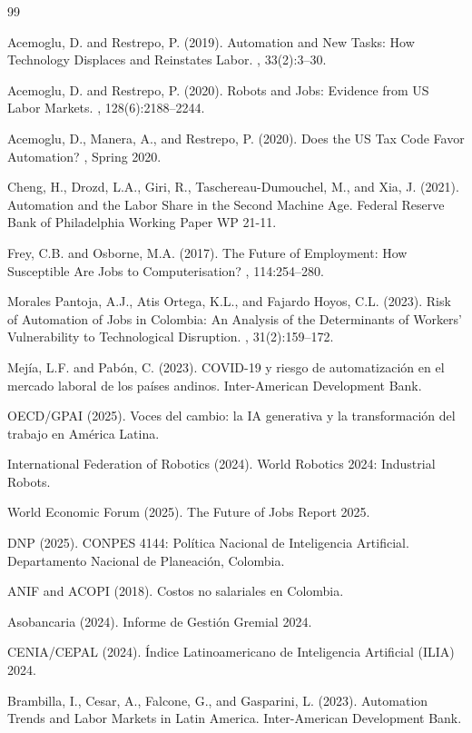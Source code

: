 \documentclass{article}
\begin{document}
\begin{thebibliography}{99}

Acemoglu, D. and Restrepo, P. (2019).
\newblock Automation and New Tasks: How Technology Displaces and Reinstates Labor.
, 33(2):3--30.

Acemoglu, D. and Restrepo, P. (2020).
\newblock Robots and Jobs: Evidence from US Labor Markets.
, 128(6):2188--2244.

Acemoglu, D., Manera, A., and Restrepo, P. (2020).
\newblock Does the US Tax Code Favor Automation?
, Spring 2020.

Cheng, H., Drozd, L.A., Giri, R., Taschereau-Dumouchel, M., and Xia, J. (2021).
\newblock Automation and the Labor Share in the Second Machine Age.
\newblock Federal Reserve Bank of Philadelphia Working Paper WP 21-11.

Frey, C.B. and Osborne, M.A. (2017).
\newblock The Future of Employment: How Susceptible Are Jobs to Computerisation?
, 114:254--280.

Morales Pantoja, A.J., Atis Ortega, K.L., and Fajardo Hoyos, C.L. (2023).
\newblock Risk of Automation of Jobs in Colombia: An Analysis of the Determinants of Workers' Vulnerability to Technological Disruption.
, 31(2):159--172.

Mej\'ia, L.F. and Pab\'on, C. (2023).
\newblock COVID-19 y riesgo de automatizaci\'on en el mercado laboral de los pa\'ises andinos.
\newblock Inter-American Development Bank.

OECD/GPAI (2025).
\newblock Voces del cambio: la IA generativa y la transformaci\'on del trabajo en Am\'erica Latina.

International Federation of Robotics (2024).
\newblock World Robotics 2024: Industrial Robots.

World Economic Forum (2025).
\newblock The Future of Jobs Report 2025.

DNP (2025).
\newblock CONPES 4144: Pol\'itica Nacional de Inteligencia Artificial.
\newblock Departamento Nacional de Planeaci\'on, Colombia.

ANIF and ACOPI (2018).
\newblock Costos no salariales en Colombia.

Asobancaria (2024).
\newblock Informe de Gesti\'on Gremial 2024.

CENIA/CEPAL (2024).
\newblock \'Indice Latinoamericano de Inteligencia Artificial (ILIA) 2024.

Brambilla, I., Cesar, A., Falcone, G., and Gasparini, L. (2023).
\newblock Automation Trends and Labor Markets in Latin America.
\newblock Inter-American Development Bank.

\end{thebibliography}
\end{document}
